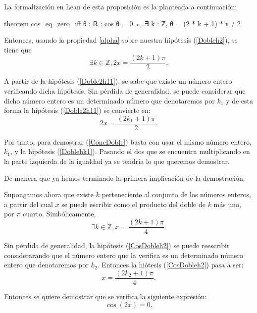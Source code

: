 \begin{demostracion}
  La formalización en Lean de esta proposición es la planteada
  a continuación:
  \begin{leancode}
    theorem cos_eq_zero_iff
      {θ : ℝ}
      : cos θ = 0 ↔ ∃ k : ℤ, θ = (2 * k + 1) * π / 2
  \end{leancode}

  Entonces, usando la propiedad \ref{alpha} sobre nuestra hipótesis
  (\ref{Dobleh2}), se tiene que
  \begin{equation}\label{Doble2h11}
    ∃k ∈ ℤ, 2x = \frac{(2k+1)π}{2}.
  \end{equation}

  A partir de la hipótesis (\ref{Doble2h11}), se sabe que existe un
  número entero verificando dicha hipótesis. Sin pérdida de generalidad,
  se puede considerar que dicho número entero es un determinado número
  que denotaremos por \(k_1\) y de esta forma la hipótesis
  (\ref{Doble2h11}) se convierte en:
  \begin{equation}\label{Doblehk1}\tag{hk1}
     2x = \frac{(2k_1+1)π}{2}.
  \end{equation}

  Por tanto, para demostrar (\ref{ConcDoble}) basta con usar el mismo
  número entero, \(k_1\), y la hipótesis (\ref{Doblehk1}). Pasando el
  dos que se encuentra multiplicando en la parte izquierda de la
  igualdad ya se tendría lo que queremos demostrar.

  De manera que ya hemos terminado la primera implicación de la
  demostración.

   \noindent
   \framebox{\longleftarrow} Supongamos ahora que existe \(k\)
   perteneciente al conjunto de los números enteros, a partir del cual
   \(x\) se puede escribir como el producto del doble de \(k \) más
   uno, por \( π\) cuarto. Simbólicamente,
   \begin{equation}\label{CosDobleh2}\tag{h2}
      ∃ k ∈ ℤ, x = \frac{(2k+1)π}{4}.
    \end{equation}

    Sin pérdida de generalidad, la hipótesis (\ref{CosDobleh2}) se puede
    reescribir considerarando que el número entero que la verifica es un
    determinado número entero que denotaremos por \(k_2\).  Entonces la
    hiótesis (\ref{CosDobleh2}) pasa a ser:
    \begin{equation}\label{hk2}\tag{hk2}
       x = \frac{(2k_2+1)π}{4}.
    \end{equation}

    Entonces se quiere demostrar que se verifica la siguiente expresión:
    \begin{equation}\label{ConcDoble3}
      \cos(2x) = 0.
    \end{equation}


\end{demostracion}
